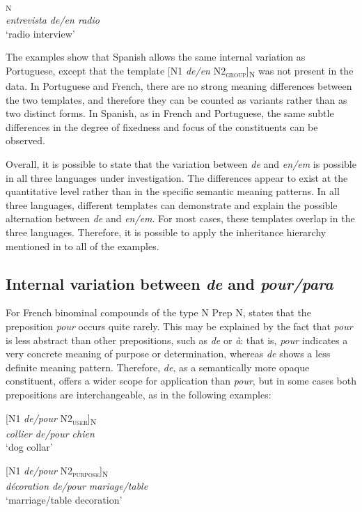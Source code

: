 \documentclass[output=paper]{langsci/langscibook}
\begin{document}
\ea{}\textsubscript{N}\\
\textit{entrevista de/en radio}\\
`radio interview'
\z

The examples show that Spanish allows the same internal variation as Portuguese, except that the template [N1 \textit{de/en} N2\textsubscript{\scshape group}]\textsubscript{N} was not present in the data. In Portuguese and French, there are no strong meaning differences between the two templates, and therefore they can be counted as variants rather than as two distinct forms. In Spanish, as in French and Portuguese, the same subtle differences in the degree of fixedness and focus of the constituents can be observed. 

Overall, it is possible to state that the variation between \textit{de} and \textit{en/em} is possible in all three languages under investigation. The differences appear to exist at the quantitative level rather than in the specific semantic meaning patterns. In all three languages, different templates can demonstrate and explain the possible alternation between \textit{de} and \textit{en/em}. For most cases, these templates overlap in the three languages. Therefore, it is possible to apply the inheritance hierarchy mentioned in  to all of the examples.

 \subsection{Internal variation between \textit{de} and \textit{pour/para}}
 
 For French binominal compounds of the type N Prep N, \citet{Laumann:1998} states that the preposition \textit{pour} occurs quite rarely. This may be explained by the fact that \textit{pour} is less abstract than other prepositions, such as \textit{de} or \textit{à}: that is, \textit{pour }indicates a very concrete meaning of purpose or determination, whereas \textit{de} shows a less definite meaning pattern. Therefore, \textit{de}, as a semantically more opaque constituent, offers a wider scope for application than \textit{pour}, but in some cases both prepositions are interchangeable, as in the following examples:

\begin{exe}\ex\begin{minipage}[t]{0.4\textwidth}    %
[N1 \textit{de/pour} N2\textsubscript{\scshape user}]\textsubscript{N}\\
\textit{collier de/pour chien}\\
`dog collar'
\end{minipage}\hfill%
\begin{minipage}[t]{0.45\textwidth}
[N1 \textit{de/pour} N2\textsubscript{\scshape purpose}]\textsubscript{N}\\
\textit{décoration de/pour mariage/table}\\
`marriage/table decoration'
\end{minipage}
\end{exe}
\end{document}
